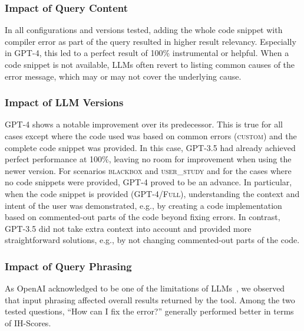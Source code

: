 \documentclass[preprint,12pt]{elsarticle}
\begin{document}
\setcounter{subsubsection}{0}
\subsubsection{Impact of Query Content}

In all configurations and versions tested, adding the whole code snippet with compiler error as part of the query resulted in higher result relevancy. Especially in GPT-4, this led to a perfect result of 100\% instrumental or helpful. When a code snippet is not available, LLMs often revert to listing common causes of the error message, which may or may not cover the underlying cause.

\subsubsection{Impact of LLM Versions}

GPT-4 shows a notable improvement over its predecessor. This is true for all cases except where the code used was based on common errors (\textsc{custom}) and the complete code snippet was provided. In this case, GPT-3.5 had already achieved perfect performance at 100\%, leaving no room for improvement when using the newer version. For scenarios \textsc{blackbox} and \textsc{user\_study} and for the cases where no code snippets were provided, GPT-4 proved to be an advance. In particular, when the code snippet is provided (\textsc{GPT-4/Full}), understanding the context and intent of the user was demonstrated, e.g., by creating a code implementation based on commented-out parts of the code beyond fixing errors. In contrast, GPT-3.5 did not take extra context into account and provided more straightforward solutions, e.g., by not changing commented-out parts of the code.

\subsubsection{Impact of Query Phrasing}

As OpenAI acknowledged to be one of the limitations of LLMs~\cite{openai}, we observed that input phrasing affected overall results returned by the tool. Among the two tested questions, ``How can I fix the error?'' generally performed better in terms of IH-Scores. 
\end{document}
